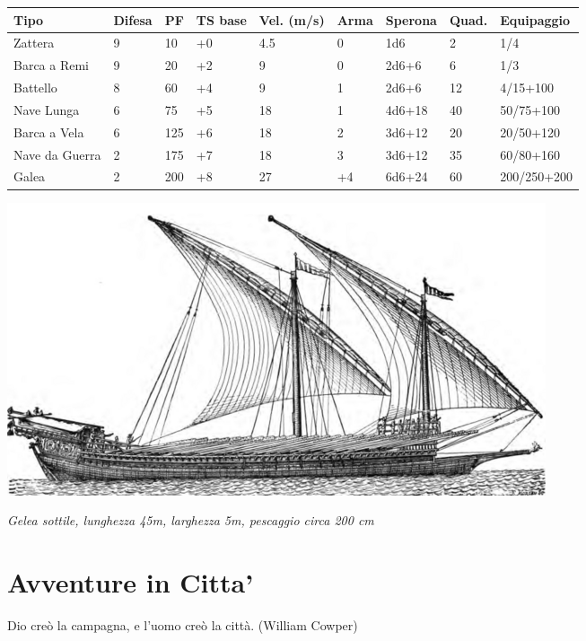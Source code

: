 \documentclass[a4paper,twoside,openany]{book}
\begin{document}
\begin{tabular}{lllllllll}
\textbf{Tipo}  & \textbf{Difesa} & \textbf{PF} & \textbf{TS base} & \textbf{Vel. (m/s)} & \textbf{Arma} & \textbf{Sperona} & \textbf{Quad}. & \textbf{Equipaggio}\\
\toprule
Zattera & 9 & 10& +0& 4.5  & 0 & 1d6  & 2  & 1/4\\
Barca a Remi & 9& 20& +2& 9  & 0 & 2d6+6  & 6  & 1/3\\
Battello  & 8& 60& +4& 9  & 1 & 2d6+6  & 12  & 4/15+100\\
Nave Lunga& 6& 75& +5& 18 & 1 & 4d6+18 & 40  & 50/75+100\\
Barca a Vela & 6& 125  & +6& 18 & 2 & 3d6+12 & 20  & 20/50+120\\
Nave da Guerra & 2& 175  & +7& 18 & 3 & 3d6+12 & 35  & 60/80+160\\
Galea& 2& 200  & +8& 27 & +4  & 6d6+24 & 60  & 200/250+200\\
\end{tabular}

\vfill

\begin{center}
\includegraphics[width=0.6\linewidth]{immagini/Galley_running_before_the_wind.png}

\smallskip

\emph{Gelea sottile, lunghezza 45m, larghezza 5m, pescaggio circa 200 cm}

\end{center}

\pagebreak

\section{Avventure in Citta'}

\label{avventure-in-citta}
\begin{changemargin}{0.3cm}{0.3cm}\begin{enfasi}{
Dio creò la campagna, e l'uomo creò la città. (William Cowper)}\end{enfasi}\end{changemargin}\medskip
\end{document}
